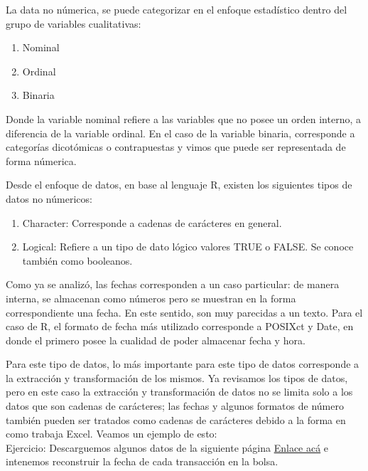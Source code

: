 \documentclass[12 pt,letterpaper]{article}
\begin{document}
La data no númerica, se puede categorizar en el enfoque estadístico dentro del grupo de variables cualitativas:

\begin{enumerate}
	\item Nominal
	\item Ordinal
	\item Binaria
\end{enumerate}

Donde la variable nominal refiere a las variables que no posee un orden interno, a diferencia de la variable ordinal. En el caso de la variable binaria, corresponde a categorías dicotómicas o contrapuestas y vimos que puede ser representada de forma númerica. 

Desde el enfoque de datos, en base al lenguaje R, existen los siguientes tipos de datos no númericos:

\begin{enumerate}
	\item Character: Corresponde a cadenas de carácteres en general. 
	\item Logical: Refiere a un tipo de dato lógico valores TRUE o FALSE. Se conoce también como booleanos. 
\end{enumerate}

Como ya se analizó, las fechas corresponden a un caso particular: de manera interna, se almacenan como números pero se muestran en la forma correspondiente una fecha. En este sentido, son muy parecidas a un texto. Para el caso de R, el formato de fecha más utilizado corresponde a POSIXct y Date, en donde el primero posee la cualidad de poder almacenar fecha y hora. 

Para este tipo de datos, lo más importante para este tipo de datos corresponde a la extracción y transformación de los mismos. Ya revisamos los tipos de datos, pero en este caso la extracción y transformación de datos no se limita solo a los datos que son cadenas de carácteres; las fechas y algunos formatos de número también pueden ser tratados como cadenas de carácteres debido a la forma en como trabaja Excel. Veamos un ejemplo de esto:\\

\noindent
{\Huge \faBell} Ejercicio: Descarguemos algunos datos de la siguiente página  \href{https://es.investing.com/indices/investing.com-btc-usd-historical-data}{Enlace acá} e intenemos reconstruir la fecha de cada transacción en la bolsa.
\end{document}
